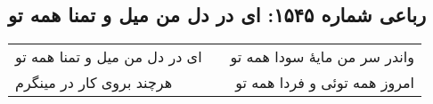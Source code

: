 \begin{center}
\section*{رباعی شماره ۱۵۴۵: ای در دل من میل و تمنا همه تو}
\label{sec:1545}
\begin{longtable}{l p{0.5cm} r}
ای در دل من میل و تمنا همه تو
&&
واندر سر من مایهٔ سودا همه تو
\\
هرچند بروی کار در مینگرم
&&
امروز همه توئی و فردا همه تو
\\
\end{longtable}
\end{center}
